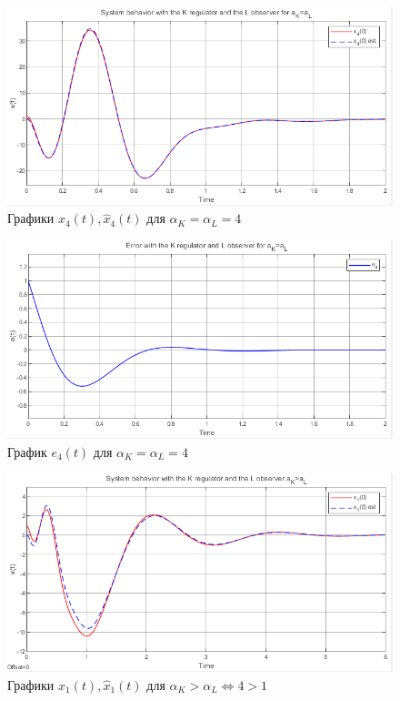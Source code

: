 \documentclass[a4paper, 12pt]{article}
\begin{document}
    \newpage
    \vspace*{20mm}
    \begin{figure}[H]
        \centering
        \includegraphics[scale=0.8]{2task_aK=aL_x4.png}
        \captionsetup{skip=0pt}
        \caption{Графики $x_4(t),\hat{x}_4(t)$ для $\alpha_K=\alpha_L=4$}
        \label{2task_aKeqaL_x4}
    \end{figure}
    \begin{figure}[H]
        \centering
        \includegraphics[scale=0.8]{2task_aK=aL_e4.png}
        \captionsetup{skip=0pt}
        \caption{График $e_4(t)$ для $\alpha_K=\alpha_L=4$}
        \label{2task_aKeqaL_e4}
    \end{figure}
    \newpage
    \vspace*{20mm}
    \begin{figure}[H]
        \centering
        \includegraphics[scale=0.8]{2task_aKgaL_x1.png}
        \captionsetup{skip=0pt}
        \caption{Графики $x_1(t),\hat{x}_1(t)$ для $\alpha_K>\alpha_L\Leftrightarrow4>1$}
        \label{2task_aKgaL_x1}
    \end{figure}
\end{document}
